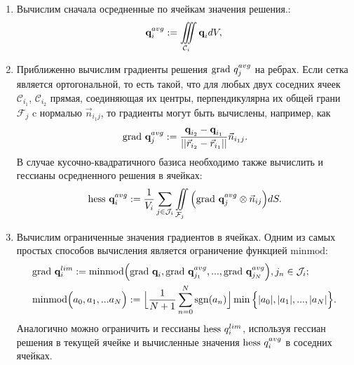 \documentclass[14pt, a4paper, fleqn]{extreport}
\begin{document}
    \begin{enumerate}
    
    \item 
    Вычислим сначала осредненные по ячейкам значения решения.:
    \begin{equation*}
        \textbf{q}_i^{avg} := \iiint\limits_{\mathcal{C}_i} \textbf{q}_i dV, \\
    \end{equation*}
    
    \item 
    Приближенно вычислим градиенты решения $\text{grad }{q}_j^{avg}$ на ребрах.
    Если сетка является ортогональной, то есть такой, что для любых двух соседних
    ячеек $\mathcal{C}_{i_1}$, $\mathcal{C}_{i_2}$ прямая, соединяющая их центры, 
    перпендикулярна их общей грани $\mathcal{F}_j$ c нормалью $\vec{n}_{i_1 j}$, 
    то градиенты могут быть вычислены, например, как
    \begin{equation*}
        \text{grad }{\textbf{q}}_j^{avg} 
            := \dfrac{\textbf{q}_{i_2} - \textbf{q}_{i_1}}{||\vec{r}_{i_2} - \vec{r}_{i_1}||}\vec{n}_{i_1 j}.
    \end{equation*}
     В случае кусочно-квадратичного базиса необходимо также вычислить и 
     гессианы осредненного решения в ячейках:
    \begin{equation*}
        \text{hess }{\textbf{q}}_i^{avg} 
            := \dfrac{1}{V_i} \sum\limits_{j \in \mathcal{J}_i}\iint\limits_{\mathcal{F}_j} 
                \Big( \text{grad }{\textbf{q}}_j^{avg} \otimes \vec{n}_{ij} \Big) dS.
    \end{equation*}
    
    \item
    Вычислим ограниченные значения градиентов в ячейках.
    Одним из самых простых способов вычисления является ограничение функцией $\text{minmod}$:
    \begin{equation*}
    \begin{split}
        &\text{grad }{\textbf{q}}_i^{lim} 
            := \text{minmod}\Big( \text{grad }{\textbf{q}_i}, \text{grad }{\textbf{q}}_{j_1}^{avg}, ..., \text{grad }{\textbf{q}}_{j_N}^{avg} \Big), 
                j_n \in \mathcal{J}_i; \\
        &\text{minmod}\Big(a_0,a_1,...a_N\Big) 
            := \Big\lfloor \dfrac{1}{N+1}\sum\limits_{n=0}^N \text{sgn}(a_n) \Big\rfloor
                \min\Big\lbrace |a_0|,|a_1|,...,|a_N| \Big\rbrace.
    \end{split}
    \end{equation*}
    Аналогично можно ограничить и гессианы $\text{hess }{q}_i^{lim}$, используя гессиан решения в текущей ячейке
    и вычисленные значения $\text{hess }{q}_i^{avg}$ в соседних ячейках.
        

\end{enumerate}
\end{document}
